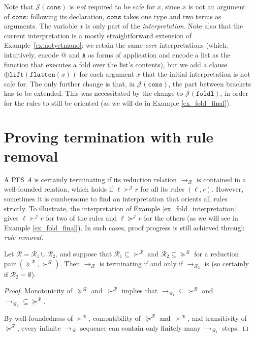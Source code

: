 \documentclass[a4paper,UKenglish,cleveref,autoref,numberwithinsect]{lipics-v2019}
\theoremstyle{definition}
\newcommand{\Rules}{\mathcal{R}}
\newcommand{\arr}[1]{\longrightarrow_{#1}}
\newcommand{\flatten}{\mathtt{flatten}}
\newcommand{\lift}{\mathtt{lift}}
\newcommand{\Termmap}{\mathcal{J}}
\newcommand{\succinterpret}{\succ^{\Termmap}}
\newcommand{\succeqinterpret}{\succeq^{\Termmap}}
\begin{document}
\begin{example}
\[  \]
Note that $\Termmap(\mathtt{cons})$ is \emph{not} required to be safe
for $x$, since $x$ is not an argument of $\mathtt{cons}$:
following its declaration, $\mathtt{cons}$ takes one type and two terms
as arguments. The variable $x$ is only part of the \emph{interpretation}.
Note also that the current interpretation is a mostly straightforward
extension of Example~\ref{ex:notyetmono}: we retain the same \emph{core}
interpretations (which, intuitively, encode $\mathtt{@}$ and
$\mathtt{A}$ as forms of application and encode a list as the function
that executes a fold over the list's contents), but we add a clause
$\oplus \lift(\flatten(x))$ for each argument $x$ that the initial
interpretation is not safe for.  The only further change is that, in
$\Termmap(\mathtt{cons})$, the part between brackets has to be extended.
This was necessitated by the change to $\Termmap(\mathtt{foldl})$, in
order for the rules to still be oriented (as we will do in
Example \ref{ex_fold_final}).
\end{example}

\section{Proving termination with rule removal}\label{sec_rule_removal}

A PFS $A$ is certainly terminating if its reduction relation
$\arr{\Rules}$ is contained in a well-founded relation, which holds if
$\ell \succinterpret r$ for all its rules $(\ell,r)$.  However,
sometimes it is cumbersome to find an interpretation that orients all
rules strictly. To illustrate, the interpretation of Example
\ref{ex_fold_interpretation} gives $\ell \succinterpret r$ for two of
the rules and $\ell \succeqinterpret r$ for the others (as we will see
in Example \ref{ex_fold_final}). In such cases, proof progress is still
achieved through \emph{rule removal}.

\begin{theorem}\label{thm:ruleremove}
  Let $\Rules = \Rules_1 \cup \Rules_2$, and suppose that
  $\Rules_1\subseteq{\succ^\Rules}$ and
  $\Rules_2\subseteq{\succeq^\Rules}$ for a reduction pair
  $(\succeq^\Rules,\succ^\Rules)$. Then $\arr{\Rules}$ is terminating
  if and only if $\arr{\Rules_2}$ is
  (so certainly if $\Rules_2 = \emptyset$).
\end{theorem}

\begin{proof}
  Monotonicity of~$\succeq^\Rules$ and~$\succ^\Rules$ implies that
  ${\arr{\Rules_1}}\subseteq{\succ^\Rules}$ and
  ${\arr{\Rules_2}}\subseteq{\succeq^\Rules}$.

  By well-foundedness of $\succ^\Rules$, compatibility
  of~$\succeq^\Rules$ and~$\succ^\Rules$, and transitivity
  of~$\succeq^\Rules$, every infinite $\arr{\Rules}$ sequence can
  contain only finitely many $\arr{\Rules_1}$ steps.
\end{proof}
\end{document}
